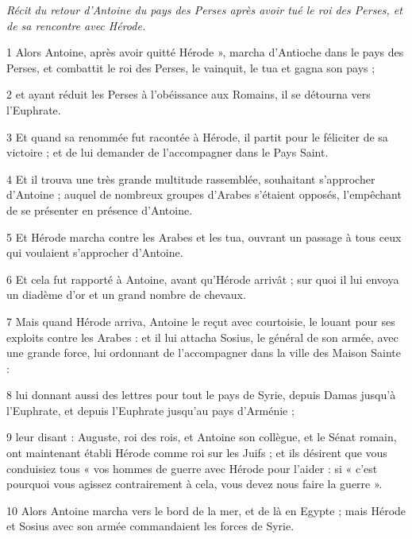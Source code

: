 
\par \textit{Récit du retour d'Antoine du pays des Perses après avoir tué le roi des Perses, et de sa rencontre avec Hérode.}

\par 1 Alors Antoine, après avoir quitté Hérode », marcha d'Antioche dans le pays des Perses, et combattit le roi des Perses, le vainquit, le tua et gagna son pays ;

\par 2 et ayant réduit les Perses à l'obéissance aux Romains, il se détourna vers l'Euphrate.

\par 3 Et quand sa renommée fut racontée à Hérode, il partit pour le féliciter de sa victoire ; et de lui demander de l'accompagner dans le Pays Saint.

\par 4 Et il trouva une très grande multitude rassemblée, souhaitant s'approcher d'Antoine ; auquel de nombreux groupes d'Arabes s'étaient opposés, l'empêchant de se présenter en présence d'Antoine.

\par 5 Et Hérode marcha contre les Arabes et les tua, ouvrant un passage à tous ceux qui voulaient s'approcher d'Antoine.

\par 6 Et cela fut rapporté à Antoine, avant qu'Hérode arrivât ; sur quoi il lui envoya un diadème d'or et un grand nombre de chevaux.

\par 7 Mais quand Hérode arriva, Antoine le reçut avec courtoisie, le louant pour ses exploits contre les Arabes : et il lui attacha Sosius, le général de son armée, avec une grande force, lui ordonnant de l'accompagner dans la ville des Maison Sainte :

\par 8 lui donnant aussi des lettres pour tout le pays de Syrie, depuis Damas jusqu'à l'Euphrate, et depuis l'Euphrate jusqu'au pays d'Arménie ;

\par 9 leur disant : Auguste, roi des rois, et Antoine son collègue, et le Sénat romain, ont maintenant établi Hérode comme roi sur les Juifs ; et ils désirent que vous conduisiez tous « vos hommes de guerre avec Hérode pour l'aider : si « c'est pourquoi vous agissez contrairement à cela, vous devez nous faire la guerre ».

\par 10 Alors Antoine marcha vers le bord de la mer, et de là en Egypte ; mais Hérode et Sosius avec son armée commandaient les forces de Syrie.


